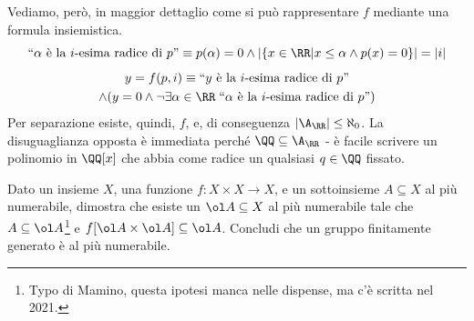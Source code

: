 Vediamo, però, in maggior dettaglio come si può rappresentare $f$ mediante una formula insiemistica.
\[
	\text{``$\alpha$ è la $i$-esima radice di $p$''} \equiv
	p(\alpha) = 0 \land |\{x \in \RR | x \leq \alpha \land p(x) = 0\}| = |i|
\]
\begin{multline*}
	y = f(p,i) \equiv \text{``$y$ è la $i$-esima radice di $p$''} \\
	\land(y = 0 \land \neg \exists \alpha \in \RR \; \text{``$\alpha$ è la $i$-esima radice di $p$''})
\end{multline*}
Per separazione esiste, quindi, $f$, e, di conseguenza $|\A_{\RR}| \leq \aleph_0$. La disuguaglianza opposta è immediata perché $\QQ \subseteq \A_{\RR}$ - è facile scrivere un polinomio in $\QQ[x]$ che abbia come radice un qualsiasi $q \in \QQ$ fissato.

\begin{exercise}
	Dato un insieme $X$, una funzione $f : X \times X \to X$, e un sottoinsieme $A \subseteq X$ al più numerabile, dimostra che esiste un $\ol A \subseteq X$ al più numerabile tale che $A \subseteq \ol A$\footnote{Typo di Mamino, questa ipotesi manca nelle dispense, ma c'è scritta nel 2021.}
	e $f[\ol A \times \ol A] \subseteq \ol A$. Concludi che un gruppo finitamente generato è al più numerabile.
\end{exercise}

